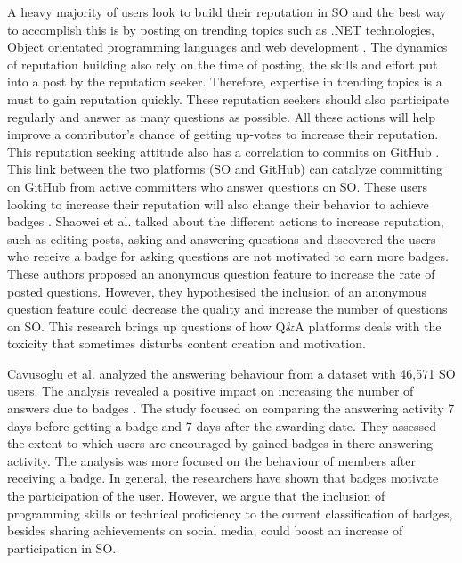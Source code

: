 \documentclass{sigchi}
\begin{document}
A heavy majority of users look to build their reputation in SO and the best way to accomplish this is by posting on trending topics such as .NET technologies, Object orientated programming languages and web development \cite{Bosu}. The dynamics of reputation building also rely on the time of posting, the skills and effort put into a post by the reputation seeker. Therefore, expertise in trending topics is a must to gain reputation quickly. These reputation seekers should also participate regularly and answer as many questions as possible. All these actions will help improve a contributor's chance of getting up-votes to increase their reputation.  This reputation seeking attitude also has a correlation to commits on GitHub \cite{Vasilescu}. This link between the two platforms (SO and GitHub) can catalyze committing on GitHub from active committers who answer questions on SO. These users looking to increase their reputation will also change their behavior to achieve badges \cite{Wang}.  Shaowei et al. talked about the different actions to increase reputation, such as editing posts, asking and answering questions and discovered the users who receive a badge for asking questions are not motivated to earn more badges. These authors proposed an anonymous question feature to increase the rate of posted questions. However, they hypothesised the inclusion of an anonymous question feature could decrease the quality and increase the number of questions on SO. This research brings up questions of how Q\&A platforms deals with the toxicity that sometimes disturbs content creation and motivation.

Cavusoglu et al. analyzed the answering behaviour from a dataset with 46,571 SO users. The analysis revealed a positive impact on increasing the number of answers due to badges \cite{Cavusoglu}. The study focused on comparing the answering activity 7 days before getting a badge and 7 days after the awarding date. They assessed the extent to which users are encouraged by gained badges in there answering activity. The analysis was more focused on the behaviour of members after receiving a badge. In general, the researchers have shown that badges motivate the participation of the user. However, we argue that the inclusion of programming skills or technical proficiency to the current classification of badges, besides sharing achievements on social media, could boost an increase of participation in SO.
\end{document}
